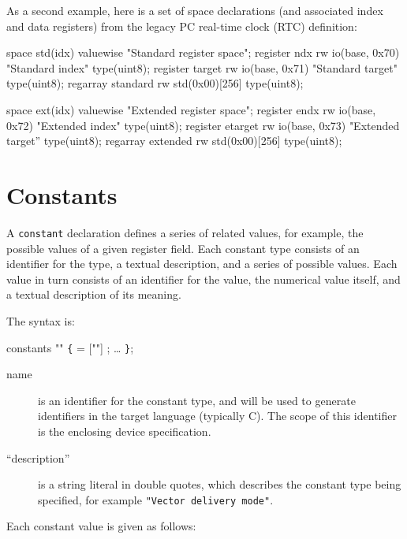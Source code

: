 \documentclass[a4paper,11pt,twoside]{report}
\begin{document}
As a second example, here is a set of space declarations (and
associated index and data registers) from the legacy PC real-time
clock (RTC) definition: 

\begin{example}
space std(idx) valuewise "Standard register space";
register ndx rw io(base, 0x70) "Standard index" 
             type(uint8);
register target rw io(base, 0x71) "Standard target" 
             type(uint8);
regarray standard rw std(0x00)[256] type(uint8);

space ext(idx) valuewise "Extended register space"; 
register endx rw io(base, 0x72) "Extended index" 
             type(uint8);
register etarget rw io(base, 0x73) "Extended target''
             type(uint8);
regarray extended rw std(0x00)[256] type(uint8);
\end{example}

\section{Constants}\label{sec:constants}

A \texttt{constant} declaration defines a series of related values,
for example, the possible values of a given register field.  Each
constant type consists of an identifier for the type, a textual
description, and a series of possible values.   Each value in turn
consists of an identifier for the value, the numerical value itself,
and a textual description of its meaning. 

The syntax is:

\begin{syntax}
constants  "" \verb+{+ 
    =  [""] ;
   \ldots
\verb+}+; 
\end{syntax}


\begin{description}
\item[name] is an identifier for the constant type, and will be used to
  generate identifiers in the target language (typically C).  The
  scope of this identifier is the enclosing device specification.  

\item [``description''] is a string literal in double quotes, which
  describes the constant type being specified, for example
  \texttt{"Vector delivery mode"}. 
\end{description}

Each constant value is given as follows:
\end{document}
